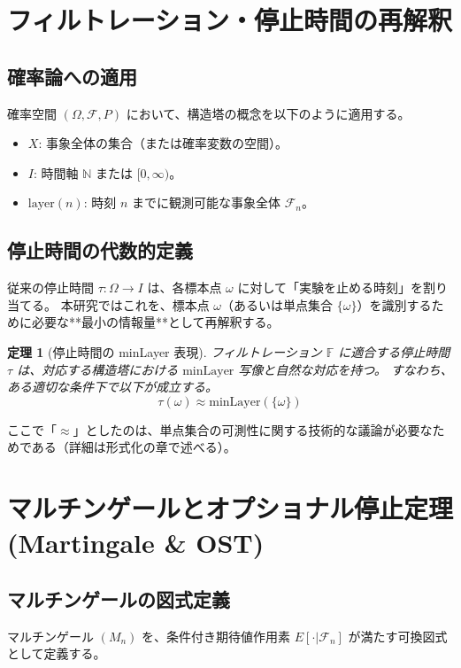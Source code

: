 \documentclass[11pt, a4paper]{article}
\newtheorem{theorem}{定理}[section]
\begin{document}
\section{フィルトレーション・停止時間の再解釈}

\subsection{確率論への適用}
確率空間 $(\Omega, \mathcal{F}, P)$ において、構造塔の概念を以下のように適用する。
\begin{itemize}
    \item $X$: 事象全体の集合（または確率変数の空間）。
    \item $I$: 時間軸 $\mathbb{N}$ または $[0, \infty)$。
    \item $\text{layer}(n)$: 時刻 $n$ までに観測可能な事象全体 $\mathcal{F}_n$。
\end{itemize}

\subsection{停止時間の代数的定義}
従来の停止時間 $\tau: \Omega \to I$ は、各標本点 $\omega$ に対して「実験を止める時刻」を割り当てる。
本研究ではこれを、標本点 $\omega$（あるいは単点集合 $\{\omega\}$）を識別するために必要な**最小の情報量**として再解釈する。

\begin{theorem}[停止時間の minLayer 表現]
フィルトレーション $\mathbb{F}$ に適合する停止時間 $\tau$ は、対応する構造塔における $\text{minLayer}$ 写像と自然な対応を持つ。
すなわち、ある適切な条件下で以下が成立する。
$$ \tau(\omega) \approx \text{minLayer}(\{\omega\}) $$
\end{theorem}

ここで「$\approx$」としたのは、単点集合の可測性に関する技術的な議論が必要なためである（詳細は形式化の章で述べる）。

\section{マルチンゲールとオプショナル停止定理 (Martingale \& OST)}

\subsection{マルチンゲールの図式定義}
マルチンゲール $(M_n)$ を、条件付き期待値作用素 $E[\cdot | \mathcal{F}_n]$ が満たす可換図式として定義する。
\end{document}
